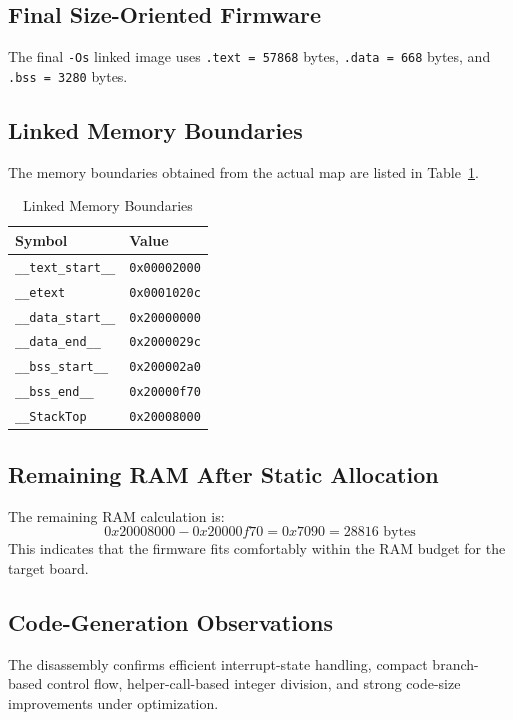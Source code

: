 \documentclass[conference]{IEEEtran}
\begin{document}
\subsection{Final Size-Oriented Firmware}
The final \texttt{-Os} linked image uses \texttt{.text = 57868} bytes, \texttt{.data = 668} bytes, and \texttt{.bss = 3280} bytes.

\subsection{Linked Memory Boundaries}
The memory boundaries obtained from the actual map are listed in Table~\ref{tab:memory-map}.

\begin{table}[!t]
\caption{Linked Memory Boundaries}
\label{tab:memory-map}
\centering
\scriptsize
\begin{tabular}{|l|l|}
\hline
\textbf{Symbol} & \textbf{Value} \\
\hline
\texttt{\_\_text\_start\_\_} & \texttt{0x00002000} \\
\hline
\texttt{\_\_etext} & \texttt{0x0001020c} \\
\hline
\texttt{\_\_data\_start\_\_} & \texttt{0x20000000} \\
\hline
\texttt{\_\_data\_end\_\_} & \texttt{0x2000029c} \\
\hline
\texttt{\_\_bss\_start\_\_} & \texttt{0x200002a0} \\
\hline
\texttt{\_\_bss\_end\_\_} & \texttt{0x20000f70} \\
\hline
\texttt{\_\_StackTop} & \texttt{0x20008000} \\
\hline
\end{tabular}
\normalsize
\end{table}

\subsection{Remaining RAM After Static Allocation}
The remaining RAM calculation is:
\[
0x20008000 - 0x20000f70 = 0x7090 = 28816 \text{ bytes}
\]
This indicates that the firmware fits comfortably within the RAM budget for the target board.

\subsection{Code-Generation Observations}
The disassembly confirms efficient interrupt-state handling, compact branch-based control flow, helper-call-based integer division, and strong code-size improvements under optimization.
\end{document}
